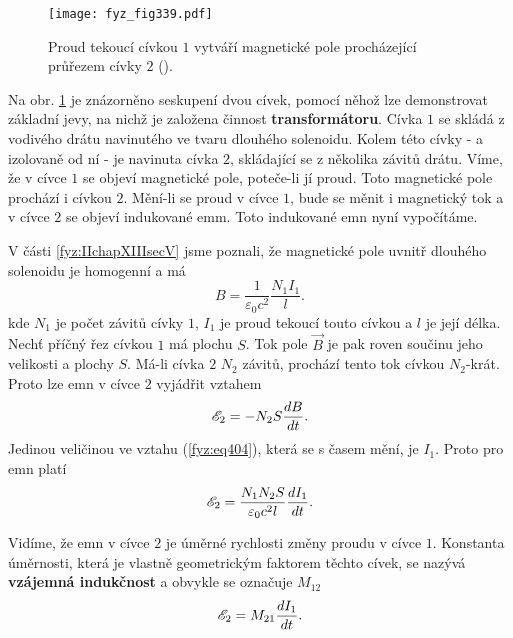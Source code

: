 {  \begin{figure}[ht!]  %
    \centering
    \texttt{[image: fyz\_fig339.pdf]}
    \caption{Proud tekoucí cívkou \(1\) vytváří magnetické pole procházející průřezem cívky \(2\)
             (\cite[s.~304]{Feynman02}).}
    \label{fyz:fig339}
  \end{figure}
  
  Na obr. \ref{fyz:fig339} je znázorněno seskupení dvou cívek, pomocí něhož lze demonstrovat 
  základní jevy, na nichž je založena činnost \textbf{transformátoru}. Cívka \(1\) se skládá z 
  vodivého drátu navinutého ve tvaru dlouhého solenoidu. Kolem této cívky - a izolovaně od ní - je 
  navinuta cívka \(2\), skládající se z několika závitů drátu. Víme, že v cívce \(1\) se objeví 
  magnetické pole, poteče-li jí proud. Toto magnetické pole prochází i cívkou \(2\). Mění-li se 
  proud v cívce \(1\), bude se měnit i magnetický tok a v cívce \(2\) se objeví indukované emm. 
  Toto indukované emn nyní vypočítáme.
  
  V části \ref{fyz:IIchapXIIIsecV} jsme poznali, že magnetické pole uvnitř dlouhého solenoidu je 
  homogenní a má
  \begin{equation}\label{fyz:eq404}
    B = \frac{1}{\varepsilon_0c^2}\frac{N_1I_1}{l}.
  \end{equation}
  kde \(N_1\) je počet závitů cívky \(1\), \(I_1\) je proud tekoucí touto cívkou a \(l\) je její 
  délka. Nechť příčný řez cívkou \(1\) má plochu \(S\). Tok pole \(\vec{B}\) je pak roven součinu 
  jeho velikosti a plochy \(S\). Má-li cívka \(2\) \(N_2\) závitů, prochází tento tok cívkou 
  \(N_2\)-krát. Proto lze emn v cívce \(2\) vyjádřit vztahem
  \begin{equation}\label{fyz:eq405}
    \mathscr{E}_2 = -N_2S\dfrac{d B}{d t}.
  \end{equation}
  Jedinou veličinou ve vztahu (\ref{fyz:eq404}), která se s časem mění, je \(I_1\). Proto pro emn 
  platí
  \begin{equation}\label{fyz:eq406}
    \mathscr{E}_2 = \frac{N_1N_2S}{\varepsilon_0c^2l}\dfrac{d I_1}{d t}.
  \end{equation}
  
  Vidíme, že emn v cívce \(2\) je úměrné rychlosti změny proudu v cívce \(1\). Konstanta úměrnosti, 
  která je vlastně geometrickým faktorem těchto cívek, se nazývá \textbf{vzájemná indukčnost} a 
  obvykle se označuje \(M_{12}\)
  \begin{equation}\label{fyz:eq407}
    \mathscr{E}_2 = M_{21}\dfrac{d I_1}{d t}.
  \end{equation}
  
}
